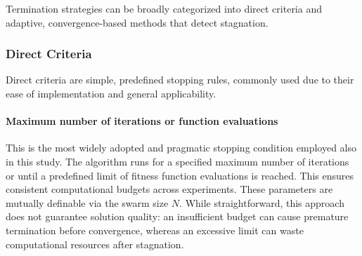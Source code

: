 {Termination strategies can be broadly categorized into direct criteria and adaptive, convergence-based methods that detect stagnation.

\subsubsection{Direct Criteria}

Direct criteria are simple, predefined stopping rules, commonly used due to their ease of implementation and general applicability.




\paragraph{Maximum number of iterations or function evaluations}
This is the most widely adopted and pragmatic stopping condition employed also in this study. The algorithm runs for a specified maximum number of iterations 
or until a predefined limit of fitness function evaluations is reached. This ensures consistent computational budgets across experiments. These parameters are mutually definable via the swarm size $N$.
While straightforward, this approach does not guarantee solution quality: an insufficient budget can cause premature termination before convergence, whereas an excessive limit can waste computational resources after stagnation.

}
